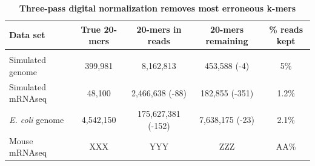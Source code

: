 \documentclass[10pt]{article}
\begin{document}
\begin{table}[!ht]
\caption{
\bf{Three-pass digital normalization removes most erroneous k-mers}}
\begin{tabular}{|l|c|c|c|c|}
Data set & True 20-mers & 20-mers in reads & 20-mers remaining & \% reads kept\\
\hline \\
Simulated genome & 399,981 & 8,162,813 & 453,588 (-4) & 5\% \\
Simulated mRNAseq & 48,100 & 2,466,638 (-88) & 182,855 (-351) & 1.2\% \\
{\em E. coli} genome & 4,542,150 & 175,627,381 (-152) & 7,638,175 (-23) & 2.1\% \\
Mouse mRNAseq & XXX & YYY & ZZZ & AA\% \\
\end{tabular}
\begin{flushleft}
\end{flushleft}
\label{tab:normC5}
\end{table}
\end{document}
